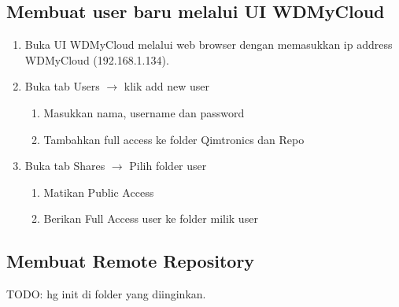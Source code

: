 \documentclass[]{article}
\begin{document}
\subsection{Membuat user baru melalui UI WDMyCloud}
\begin{enumerate}
  \item Buka UI WDMyCloud melalui web browser dengan memasukkan ip address
    WDMyCloud (192.168.1.134).
  \item Buka tab Users $\rightarrow$ klik add new user
    \begin{enumerate}
      \item Masukkan nama, username dan password
      \item Tambahkan full access ke folder Qimtronics dan Repo
    \end{enumerate}
  \item Buka tab Shares $\rightarrow$ Pilih folder user
    \begin{enumerate}
      \item Matikan Public Access
      \item Berikan Full Access user ke folder milik user
    \end{enumerate}
\end{enumerate}

\subsection{Membuat Remote Repository}
TODO: hg init di folder yang diinginkan.
\end{document}
